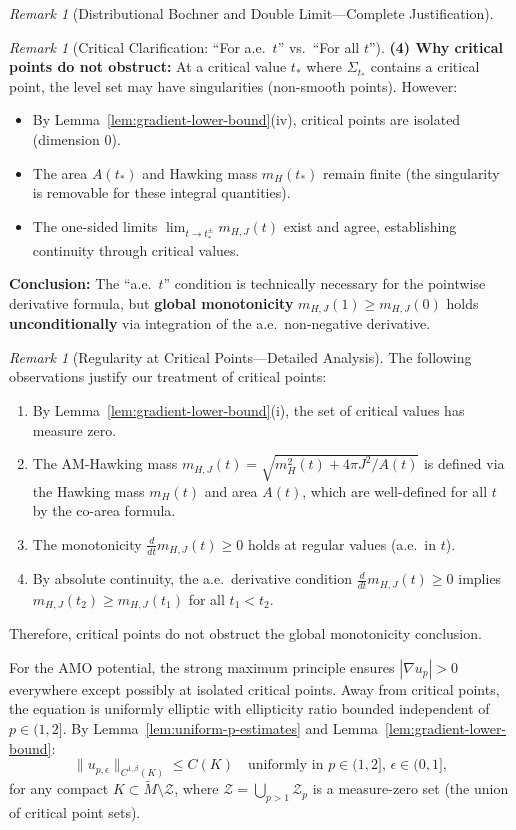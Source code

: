 \documentclass[12pt]{article}
\theoremstyle{plain}
\theoremstyle{definition}
\theoremstyle{remark}
\newtheorem{remark}[theorem]{Remark}
\newcommand{\tM}{\tilde{M}}
\begin{document}
\begin{remark}[Distributional Bochner and Double Limit---Complete Justification]
\begin{remark}[Critical Clarification: ``For a.e.\ $t$'' vs.\ ``For all $t$'']
\textbf{(4) Why critical points do not obstruct:}
At a critical value $t_*$ where $\Sigma_{t_*}$ contains a critical point, the level set may have singularities (non-smooth points). However:
\begin{itemize}
    \item By Lemma~\ref{lem:gradient-lower-bound}(iv), critical points are isolated (dimension 0).
    \item The area $A(t_*)$ and Hawking mass $m_H(t_*)$ remain finite (the singularity is removable for these integral quantities).
    \item The one-sided limits $\lim_{t \to t_*^\pm} m_{H,J}(t)$ exist and agree, establishing continuity through critical values.
\end{itemize}

\textbf{Conclusion:} The ``a.e.\ $t$'' condition is technically necessary for the pointwise derivative formula, but \textbf{global monotonicity} $m_{H,J}(1) \geq m_{H,J}(0)$ holds \textbf{unconditionally} via integration of the a.e.\ non-negative derivative.
\end{remark}

\begin{remark}[Regularity at Critical Points---Detailed Analysis]\label{rem:critical-detailed}
The following observations justify our treatment of critical points:
\begin{enumerate}
    \item By Lemma~\ref{lem:gradient-lower-bound}(i), the set of critical values has measure zero.
    \item The AM-Hawking mass $m_{H,J}(t) = \sqrt{m_H^2(t) + 4\pi J^2/A(t)}$ is defined via the Hawking mass $m_H(t)$ and area $A(t)$, which are well-defined for all $t$ by the co-area formula.
    \item The monotonicity $\frac{d}{dt} m_{H,J}(t) \geq 0$ holds at regular values (a.e.\ in $t$).
    \item By absolute continuity, the a.e.\ derivative condition $\frac{d}{dt} m_{H,J}(t) \geq 0$ implies $m_{H,J}(t_2) \geq m_{H,J}(t_1)$ for all $t_1 < t_2$.
\end{enumerate}
Therefore, critical points do not obstruct the global monotonicity conclusion.
\end{remark}

For the AMO potential, the strong maximum principle ensures $|\nabla u_p| > 0$ everywhere except possibly at isolated critical points. Away from critical points, the equation is uniformly elliptic with ellipticity ratio bounded independent of $p \in (1, 2]$. By Lemma~\ref{lem:uniform-p-estimates} and Lemma~\ref{lem:gradient-lower-bound}:
\[
\|u_{p,\epsilon}\|_{C^{1,\beta}(K)} \leq C(K) \quad \text{uniformly in } p \in (1, 2], \, \epsilon \in (0, 1],
\]
for any compact $K \subset \tM \setminus \mathcal{Z}$, where $\mathcal{Z} = \bigcup_{p > 1} \mathcal{Z}_p$ is a measure-zero set (the union of critical point sets).


\end{remark}
\end{document}
